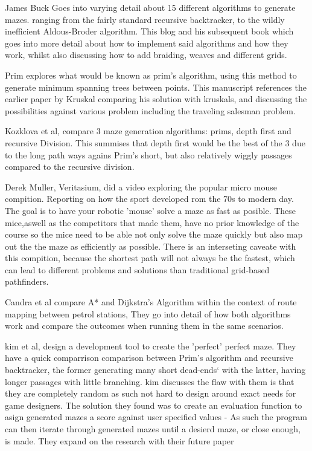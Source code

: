 \documentclass[conference]{IEEEtran}
\begin{document}
\cite{MazeAlgorithms} James Buck Goes into varying detail about 15 different algorithms to generate mazes. ranging from the fairly standard recursive backtracker, to the wildly inefficient Aldous-Broder algorithm. This blog and his subsequent book \cite{buckMazesProgrammersCode2015a} which goes into more detail about how to implement said algorithms and how they work, whilst also discussing how to add braiding, weaves and different grids.

\cite{zotero-item-159} Prim explores what would be known as prim's algorithm, using this method to generate minimum spanning trees between points. This manuscript references the earlier paper by Kruskal\cite{kruskalSHORTESTSPANNINGSUBTREE} comparing his solution with kruskals, and discussing the possibilities against various problem including the traveling salesman problem. 

\cite{kozlovaExaminationRepresentationalExpression2015} Kozklova et al, compare 3 maze generation algorithms: prims, depth first and recursive Division. This summises that depth first would be the best of the 3 due to the long path ways agains Prim's short, but also relatively wiggly passages compared to the recursive division.

\cite{veritasiumFastestMazeSolvingCompetition2023} Derek Muller, Veritasium, did a video exploring the popular micro mouse compition. Reporting on how the sport developed rom the 70s to modern day. The goal is to have your robotic 'mouse' solve a maze as fast as posible. These mice,aswell as the competitors that made them, have no prior knowledge of the course so the mice need to be able not only solve the maze quickly but also map out the the maze as efficiently as possible. There is an interseting caveate with this compition, because the shortest path will not always be the fastest, which can lead to different problems and solutions than traditional grid-based pathfinders.

\cite{candraDijkstrasAStarFinding2020} Candra et al compare A* and Dijkstra's Algorithm within the context of route mapping between petrol stations, They go into detail of how both algorithms work and compare the outcomes when running them in the same scenarios.

\cite{kimQuestPerfectPerfectmaze2015} kim et al, design a development tool to create the 'perfect' perfect maze. They have a quick comparrison comparison between Prim's algorithm \cite{zotero-item-159} and recursive backtracker, the former generating many short dead-ends` with the latter, having longer passages with little branching. kim discusses the flaw with them is that they are completely random as such not hard to design around exact needs for game designers. The solution they found was to create an evaluation function to asign generated mazes a score against user specified values - As such the program can then iterate through generated mazes until a desierd maze, or close enough, is made. They expand on the research with their future paper\cite{kimIntelligentMazeGeneration2018} 
\end{document}
